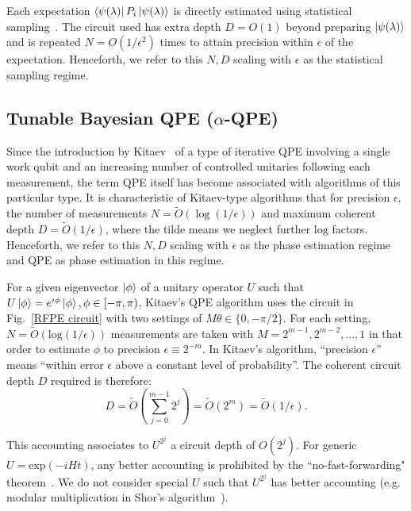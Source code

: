 \documentclass[twocolumn,
 reprint,
 amsmath,amssymb,
 aps,
 floatfix,
superscriptaddress
]{revtex4-1}
\begin{document}
Each expectation  $\Bra{\psi(\lambda)}P_{i}\Ket{\psi(\lambda)}$ is directly estimated using statistical sampling~\cite{Romero2017}. The circuit used has extra depth $D=O(1)$ beyond preparing $\Ket{\psi(\lambda)}$ and is repeated $N=O(1/\epsilon^{2})$ times to attain precision within $\epsilon$ of the expectation. Henceforth, we refer to this $N,D$ scaling with $\epsilon$ as the statistical sampling regime. 


\subsection{Tunable Bayesian QPE ($\alpha$-QPE) \label{subsec:Tunable Bayesian QPE}}

Since the introduction by Kitaev~\cite{Kitaev} of a type of iterative
QPE involving a single work qubit and an increasing number of controlled
unitaries following each measurement, the term QPE itself has become
associated with algorithms of this particular type. It is characteristic
of Kitaev-type algorithms that for precision $\epsilon$, the number
of measurements $N=\tilde{O}(\log(1/\epsilon))$ and maximum coherent depth $D=\tilde{O}(1/\epsilon)$, where the tilde means we neglect further
$\text{log}$ factors. Henceforth,
we refer to this $N,D$ scaling with $\epsilon$ as the phase estimation regime and QPE as phase estimation in this regime.

For a given eigenvector $\Ket{\phi}$ of a unitary operator
$U$ such that $U\Ket{\phi}=e^{i\phi}\Ket{\phi},\phi\in[-\pi,\pi)$, Kitaev's QPE algorithm uses the circuit in Fig.~\ref{RFPE circuit} with two
settings of $M\theta\in\{0,-\pi/2\}$. For each setting, $N=\tilde{O}(\text{log}(1/\epsilon))$ measurements are taken with $M = 2^{m-1}, 2^{m-2},...,1$ in that order to estimate $\phi$ to precision $\epsilon\equiv2^{-m}$. In Kitaev's algorithm, ``precision $\epsilon$'' means ``within error $\epsilon$ above a constant level of probability''.  The coherent circuit depth $D$ required is therefore:
\begin{equation}\label{eq:kitaev_qpe_depth}
D=\tilde{O} \left( \sum_{j=0}^{m-1}{2^{j}} \right) = \tilde{O} \left( 2^{m} \right)=\tilde{O} \left(1/\epsilon \right).
\end{equation}

This accounting associates to $U^{2^{j}}$ a circuit depth of $O(2^{j})$. For generic $U=\text{exp}(-iHt)$, any better accounting is prohibited by the ``no-fast-forwarding" theorem~\cite{Berry2007}. We do not consider special $U$ such that $U^{2^{j}}$ has better accounting (e.g. modular multiplication in Shor's algorithm~\cite{Nielsen2010}).
\end{document}

